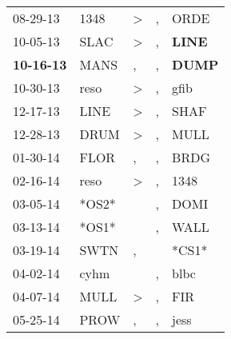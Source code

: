 \begin{supertabular}{p{0.07\textwidth}p{0.06\textwidth}p{0.02\textwidth}p{0.02\textwidth}p{0.06\textwidth}}
          08-29-13\textsuperscript{} &           1348\textsuperscript{} &     \textgreater &                , &           ORDE\textsuperscript{} \\
          10-05-13\textsuperscript{} &           SLAC\textsuperscript{} &     \textgreater &                , &  \textbf{LINE\textsuperscript{}} \\
 \textbf{10-16-13\textsuperscript{}} &           MANS\textsuperscript{} &                , &                , &  \textbf{DUMP\textsuperscript{}} \\
          10-30-13\textsuperscript{} &           reso\textsuperscript{} &     \textgreater &                , &           gfib\textsuperscript{} \\
          12-17-13\textsuperscript{} &           LINE\textsuperscript{} &     \textgreater &                , &           SHAF\textsuperscript{} \\
          12-28-13\textsuperscript{} &           DRUM\textsuperscript{} &     \textgreater &                , &           MULL\textsuperscript{} \\
          01-30-14\textsuperscript{} &           FLOR\textsuperscript{} &                , &                , &           BRDG\textsuperscript{} \\
          02-16-14\textsuperscript{} &           reso\textsuperscript{} &     \textgreater &                , &           1348\textsuperscript{} \\
          03-05-14\textsuperscript{} &                            *OS2* &                  &                , &           DOMI\textsuperscript{} \\
          03-13-14\textsuperscript{} &                            *OS1* &                  &                , &           WALL\textsuperscript{} \\
          03-19-14\textsuperscript{} &           SWTN\textsuperscript{} &                , &                  &                            *CS1* \\
          04-02-14\textsuperscript{} &           cyhm\textsuperscript{} &                  &                , &           blbc\textsuperscript{} \\
          04-07-14\textsuperscript{} &           MULL\textsuperscript{} &     \textgreater &                , &            FIR\textsuperscript{} \\
          05-25-14\textsuperscript{} &           PROW\textsuperscript{} &                , &                , &           jess\textsuperscript{} \\

\end{supertabular}
